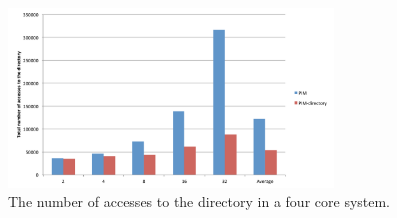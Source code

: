 \begin{figure}[h]
  \centering
  \includegraphics[height = 2.5 in, width=3.4in]{figures/figure8.pdf}
  \caption{The number of accesses to the directory in a four core system.}
  \label{fig:profile}
\end{figure}

